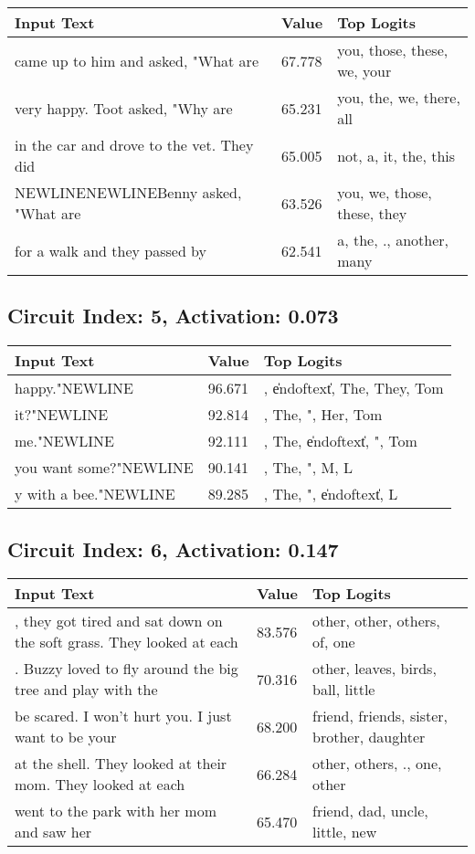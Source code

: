 \documentclass{article}
\begin{document}
\begin{longtable}{p{} p{} p{}}
\toprule
\textbf{Input Text} & \textbf{Value} & \textbf{Top Logits} \\
\midrule
came up to him and asked, "What are & 67.778 & you, those, these, we, your \\
very happy. Toot asked, "Why are & 65.231 & you, the, we, there, all \\
in the car and drove to the vet. They did & 65.005 & not, a, it, the, this \\
NEWLINENEWLINEBenny asked, "What are & 63.526 & you, we, those, these, they \\
for a walk and they passed by & 62.541 & a, the, ., another, many \\

\bottomrule
\end{longtable}
\subsection*{Circuit Index: 5, Activation: 0.073}

\begin{longtable}{p{} p{} p{}}
\toprule
\textbf{Input Text} & \textbf{Value} & \textbf{Top Logits} \\
\midrule
happy."NEWLINE & 96.671 & , \<\|endoftext\|\>, The, They, Tom \\
it?"NEWLINE & 92.814 & , The, ", Her, Tom \\
me."NEWLINE & 92.111 & , The, \<\|endoftext\|\>, ", Tom \\
you want some?"NEWLINE & 90.141 & , The, ", M, L \\
y with a bee."NEWLINE & 89.285 & , The, ", \<\|endoftext\|\>, L \\

\bottomrule
\end{longtable}
\subsection*{Circuit Index: 6, Activation: 0.147}

\begin{longtable}{p{} p{} p{}}
\toprule
\textbf{Input Text} & \textbf{Value} & \textbf{Top Logits} \\
\midrule
, they got tired and sat down on the soft grass. They looked at each & 83.576 & other, other, others, of, one \\
. Buzzy loved to fly around the big tree and play with the & 70.316 & other, leaves, birds, ball, little \\
be scared. I won't hurt you. I just want to be your & 68.200 & friend, friends, sister, brother, daughter \\
at the shell. They looked at their mom. They looked at each & 66.284 & other, others, ., one, other \\
went to the park with her mom and saw her & 65.470 & friend, dad, uncle, little, new \\

\bottomrule
\end{longtable}
\end{document}
